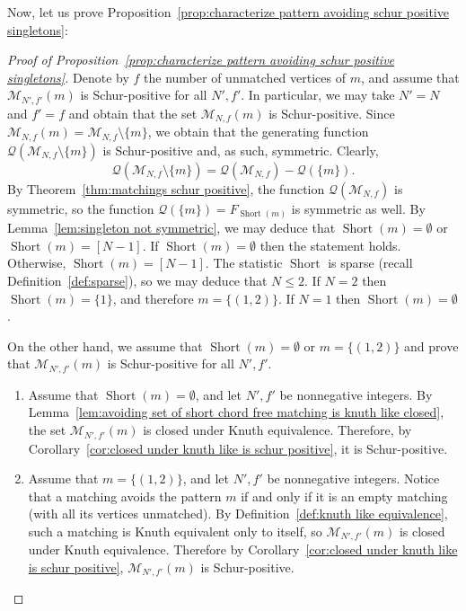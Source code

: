 \documentclass[ALCO]{cedram}
\newcommand{\Short}{\operatorname{Short}}
\newcommand{\Q}{\mathcal{Q}}
\newcommand{\M}{\mathcal{M}}
\begin{document}
Now, let us prove Proposition~\ref{prop:characterize pattern avoiding schur positive singletons}:
\begin{proof}[Proof of Proposition~\ref{prop:characterize pattern avoiding schur positive singletons}]
    Denote by $f$ the number of unmatched vertices of $m$, and assume that $\M_{N',f'}(m)$ is Schur-positive for all $N',f'$. In particular, we may take $N'=N$ and $f'=f$ and obtain that the set $\M_{N,f}(m)$ is Schur-positive. Since $\M_{N,f}(m) = \M_{N,f} \setminus \{m\}$, we obtain that the generating function $\Q(\M_{N,f} \setminus \{m\})$ is Schur-positive and, as such, symmetric. Clearly,
    \[
        \Q(\M_{N,f} \setminus \{m\})=\Q(\M_{N,f})-\Q(\{m\}).
    \]
    By Theorem~\ref{thm:matchings schur positive}, the function $\Q(\M_{N,f})$ is symmetric, so the function $\Q(\{m\}) = F_{\Short(m)}$ is symmetric as well. By Lemma~\ref{lem:singleton not symmetric}, we may deduce that $\Short(m) = \emptyset$ or $\Short(m) = [N-1]$.
    If $\Short(m) = \emptyset$ then the statement holds. Otherwise, $\Short(m) = [N-1]$. The statistic $\Short$ is sparse (recall Definition~\ref{def:sparse}), so we may deduce that $N\le 2$. If $N=2$ then $\Short(m)=\{1\}$, and therefore $m=\{(1,2)\}$. If $N=1$ then $\Short(m)= \emptyset$.

    On the other hand, we assume that $\Short(m) = \emptyset$ or $m=\{(1,2)\}$ and prove that $\M_{N',f'}(m)$ is Schur-positive for all $N',f'$.
    \begin{enumerate}
        \item Assume that $\Short(m) = \emptyset$, and let $N',f'$ be nonnegative integers.
        By Lemma~\ref{lem:avoiding set of short chord free matching is knuth like closed}, the set $\M_{N',f'}(m)$ is closed under Knuth equivalence. Therefore, by Corollary~\ref{cor:closed under knuth like is schur positive}, it is Schur-positive.
        \item Assume that $m=\{(1,2)\}$, and let $N',f'$ be nonnegative integers. Notice that a matching avoids the pattern $m$ if and only if it is an empty matching (\ie with all its vertices unmatched). By Definition~\ref{def:knuth like equivalence}, such a matching is Knuth equivalent only to itself, so $\M_{N',f'}(m)$ is closed under Knuth equivalence. Therefore by Corollary~\ref{cor:closed under knuth like is schur positive}, $\M_{N',f'}(m)$ is Schur-positive.
        \qedhere
    \end{enumerate}
\end{proof}
\end{document}

